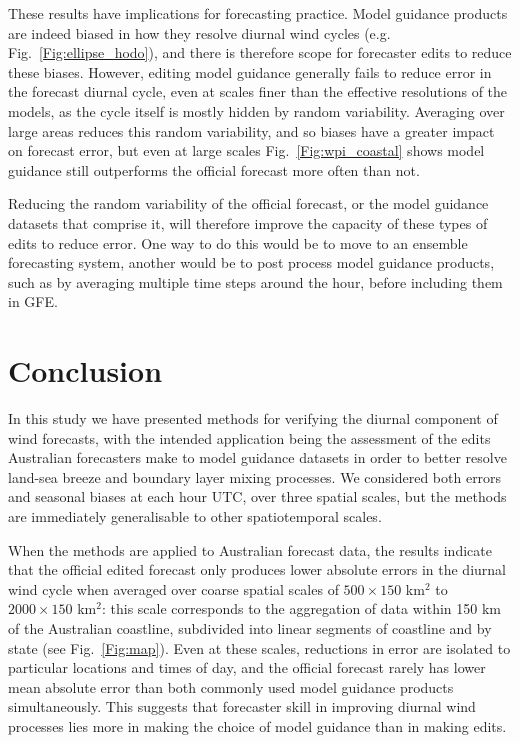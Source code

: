 \documentclass[twocol]{ametsoc}
\begin{document}
These results have implications for forecasting practice. Model guidance products are indeed biased in how they resolve diurnal wind cycles (e.g. Fig.~\ref{Fig:ellipse_hodo}), and there is therefore scope for forecaster edits to reduce these biases. However, editing model guidance generally fails to reduce error in the forecast diurnal cycle, even at scales finer than the effective resolutions of the models, as the cycle itself is mostly hidden by random variability. Averaging over large areas reduces this random variability, and so biases have a greater impact on forecast error, but even at large scales Fig.~\ref{Fig:wpi_coastal} shows model guidance still outperforms the official forecast more often than not. 

Reducing the random variability of the official forecast, or the model guidance datasets that comprise it, will therefore improve the capacity of these types of edits to reduce error. One way to do this would be to move to an ensemble forecasting system, another would be to post process model guidance products, such as by averaging multiple time steps around the hour, before including them in GFE. 

\section{Conclusion}
\label{Sec:Conclusion}
In this study we have presented methods for verifying the diurnal component of wind forecasts, with the intended application being the assessment of the edits Australian forecasters make to model guidance datasets in order to better resolve land-sea breeze and boundary layer mixing processes. We considered both errors and seasonal biases at each hour UTC, over three spatial scales, but the methods are immediately generalisable to other spatiotemporal scales. 

When the methods are applied to Australian forecast data, the results indicate that the official edited forecast only produces lower absolute errors in the diurnal wind cycle when averaged over coarse spatial scales of $500\times 150$ km$^{2}$ to $2000 \times 150$ km$^{2}$: this scale corresponds to the aggregation of data within 150 km of the Australian coastline, subdivided into linear segments of coastline and by state (see Fig.~\ref{Fig:map}). Even at these scales, reductions in error are isolated to particular locations and times of day, and the official forecast rarely has lower mean absolute error than both commonly used model guidance products simultaneously. This suggests that forecaster skill in improving diurnal wind processes lies more in making the choice of model guidance than in making edits.
\end{document}
